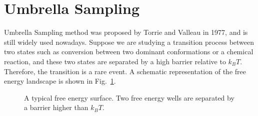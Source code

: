 \section{Umbrella Sampling\label{Sec:ES:US}}
Umbrella Sampling method was proposed by Torrie and Valleau in 1977,\cite{TorrieJComputP1977} and is still widely used nowadays.
Suppose we are studying a transition process between two states such as conversion between two dominant conformations or a chemical reaction, and these two states are separated by a high barrier relative to $k_BT$. Therefore, the transition is a rare event. A schematic representation of the free energy landscape is shown in Fig.~\ref{Fig:ES:dual_harmonic}.
\begin{figure}[htbp]
	\centering
	\caption{A typical free energy surface. Two free energy wells are separated by a barrier higher than $k_BT$.}\label{Fig:ES:dual_harmonic}
\end{figure}


